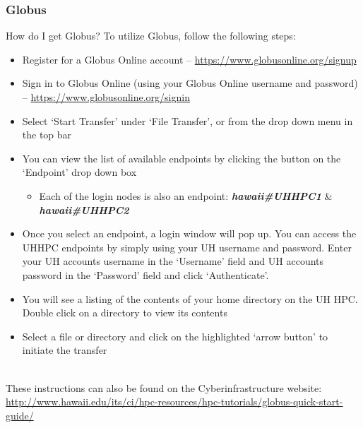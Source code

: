 \documentclass[t,hyperref={pdfpagelabels=false}]{beamer}
\newcommand{\ci}{Cyberinfrastructure}
\begin{document}
\begin{frame}
	\frametitle{Globus}\footnotesize
\begin{block}{How do I get Globus?}
To utilize Globus, follow the following steps:
\begin{itemize}\tiny
\item Register for a Globus Online account -- \url{https://www.globusonline.org/signup}
\item Sign in to Globus Online (using your Globus Online username and password) -- \url{https://www.globusonline.org/signin}
\item Select ‘Start Transfer’ under ‘File Transfer’, or from the drop down menu in the top bar
\item You can view the list of available endpoints by clicking the button on the ‘Endpoint’ drop down box
\begin{itemize}\tiny
 \item Each of the login nodes is also an endpoint: \textbf{\emph{hawaii\#UHHPC1}} \& \textbf{\emph{hawaii\#UHHPC2}}
\end{itemize}
\item Once you select an endpoint, a login window will pop up. You can access the UHHPC endpoints by simply using your UH username and password. Enter your UH accounts username in the ‘Username’ field and UH accounts password in the ‘Password’ field and click ‘Authenticate’. 
\item You will see a listing of the contents of your home directory on the UH HPC. Double click on a directory to view its contents
\item Select a file or directory and click on the highlighted ‘arrow button’ to initiate the transfer
\end{itemize}
\end{block}
~\\
These instructions can also be found on the {\ci} website:~\\
{\footnotesize \href{http://www.hawaii.edu/its/ci/hpc-resources/hpc-tutorials/globus-quick-start-guide/}{http://www.hawaii.edu/its/ci/hpc-resources/hpc-tutorials/globus-quick-start-guide/}}
\end{frame}
\end{document}
